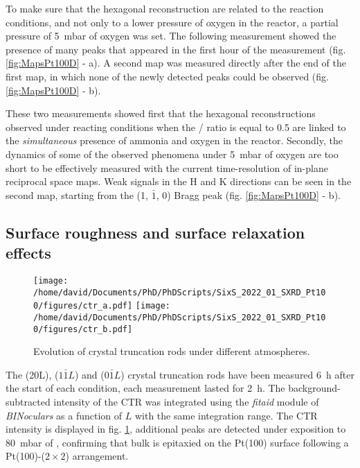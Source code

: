 To make sure that the hexagonal reconstruction are related to the reaction conditions, and not only to a lower pressure of oxygen in the reactor, a partial pressure of \qty{5}{\milli\bar} of oxygen was set.
The following measurement showed the presence of many peaks that appeared in the first hour of the measurement (fig. \ref{fig:MapsPt100D} - a).
A second map was measured directly after the end of the first map, in which none of the newly detected peaks could be observed (fig. \ref{fig:MapsPt100D} - b).

These two measurements showed first that the hexagonal reconstructions observed under reacting conditions when the / ratio is equal to \num{0.5} are linked to the \textit{simultaneous} presence of ammonia and oxygen in the reactor.
Secondly, the dynamics of some of the observed phenomena under \qty{5}{\milli\bar} of oxygen are too short to be effectively measured with the current time-resolution of in-plane reciprocal space maps.
Weak signals in the H and K directions can be seen in the second map, starting from the (1, $\bar{1}$, 0) Bragg peak (fig. \ref{fig:MapsPt100D} - b).

\subsection{Surface roughness and surface relaxation effects}

\begin{figure}[!htb]
    \centering
    \texttt{[image: /home/david/Documents/PhD/PhDScripts/SixS\_2022\_01\_SXRD\_Pt100/figures/ctr\_a.pdf]}
    \texttt{[image: /home/david/Documents/PhD/PhDScripts/SixS\_2022\_01\_SXRD\_Pt100/figures/ctr\_b.pdf]}
    \caption{
        Evolution of crystal truncation rods under different atmospheres.
    }
    \label{fig:CTRPt100}
\end{figure}

The (20L), ($1\bar{1}L$) and (0$\bar{1}L$) crystal truncation rods have been measured \qty{6}{\hour} after the start of each condition, each measurement lasted for \qty{2}{\hour}.
The background-subtracted intensity of the CTR was integrated using the \textit{fitaid} module of \textit{BINoculars} as a function of $L$ with the same integration range.
The CTR intensity is displayed in fig. \ref{fig:CTRPt100}, additional peaks are detected under exposition to \qty{80}{\milli\bar} of , confirming that bulk  is epitaxied on the Pt(100) surface following a Pt(100)-($2\times2$) arrangement.

